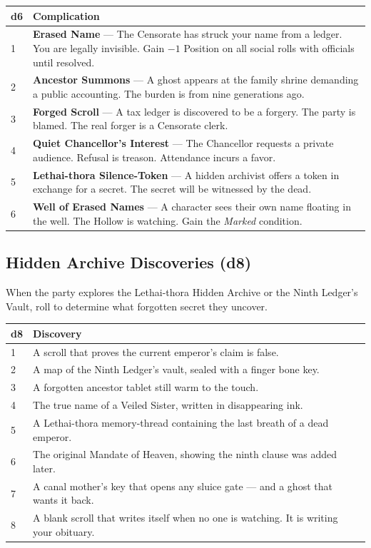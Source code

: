 \begin{longtable}{|p{1.5cm}|p{10cm}|}
\hline
\rowcolor{gray!20}
\textbf{d6} & \textbf{Complication} \\
\hline
1 & \textbf{Erased Name} --- The Censorate has struck your name from a ledger. You are legally invisible. Gain $-1$ Position on all social rolls with officials until resolved. \\
\hline
2 & \textbf{Ancestor Summons} --- A ghost appears at the family shrine demanding a public accounting. The burden is from nine generations ago. \\
\hline
3 & \textbf{Forged Scroll} --- A tax ledger is discovered to be a forgery. The party is blamed. The real forger is a Censorate clerk. \\
\hline
4 & \textbf{Quiet Chancellor's Interest} --- The Chancellor requests a private audience. Refusal is treason. Attendance incurs a favor. \\
\hline
5 & \textbf{Lethai-thora Silence-Token} --- A hidden archivist offers a token in exchange for a secret. The secret will be witnessed by the dead. \\
\hline
6 & \textbf{Well of Erased Names} --- A character sees their own name floating in the well. The Hollow is watching. Gain the \textit{Marked} condition. \\
\hline
\end{longtable}

\subsection*{Hidden Archive Discoveries (d8)}
\label{sec:sihai-archive-discoveries}

When the party explores the Lethai-thora Hidden Archive or the Ninth Ledger's Vault, roll to determine what forgotten secret they uncover.

\begin{longtable}{|p{1.5cm}|p{10cm}|}
\hline
\rowcolor{gray!20}
\textbf{d8} & \textbf{Discovery} \\
\hline
1 & A scroll that proves the current emperor's claim is false. \\
\hline
2 & A map of the Ninth Ledger's vault, sealed with a finger bone key. \\
\hline
3 & A forgotten ancestor tablet still warm to the touch. \\
\hline
4 & The true name of a Veiled Sister, written in disappearing ink. \\
\hline
5 & A Lethai-thora memory-thread containing the last breath of a dead emperor. \\
\hline
6 & The original Mandate of Heaven, showing the ninth clause was added later. \\
\hline
7 & A canal mother's key that opens any sluice gate --- and a ghost that wants it back. \\
\hline
8 & A blank scroll that writes itself when no one is watching. It is writing your obituary. \\
\hline
\end{longtable}

